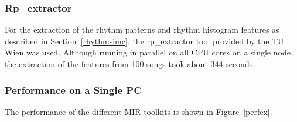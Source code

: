 \subsubsection{Rp\_extractor}

For the extraction of the rhythm patterns and rhythm histogram features as described in Section~\ref{rhythmsimc}, the rp\_extractor tool provided by the TU Wien was used. Although running in parallel on all CPU cores on a single node, the extraction of the features from 100 songs took about 344 seconds.

\subsubsection{Performance on a Single PC}

The performance of the different MIR toolkits is shown in Figure~\ref{perfex}. 

